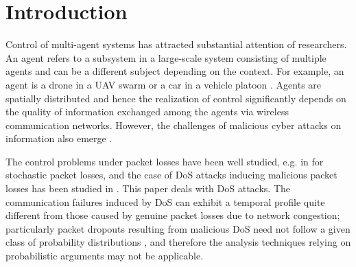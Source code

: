 \documentclass{autart}
\begin{document}
\section{Introduction}
Control of multi-agent systems has attracted substantial attention of researchers. An agent refers to a subsystem in a large-scale system consisting of multiple agents and can be a different subject depending on the context. For example, an agent is a drone in a UAV swarm or a car in a vehicle platoon \cite{FB-LNS}.
Agents are spatially distributed and hence the realization of control significantly depends on the quality of information exchanged among the agents via wireless communication networks. 
However, the challenges of malicious cyber attacks on information also emerge \cite{cardenas2009challenges}. 




 


The control problems under packet losses have been well studied, e.g. in \cite{you2010minimum} for stochastic packet losses, and the case of DoS attacks inducing malicious packet losses has been studied in \cite{de2015input, lu2017input, pierron2020tree}. This paper deals with DoS attacks. The communication failures induced by DoS can exhibit a temporal profile quite different from those caused by genuine packet losses due to 
network congestion; particularly packet dropouts resulting from malicious DoS need not follow a given class of probability distributions \cite{sastry}, and therefore the analysis techniques relying on probabilistic arguments may not be applicable. 
\end{document}
